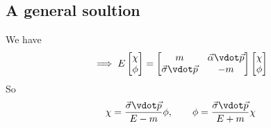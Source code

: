 \subsection{A general soultion}
\label{sec:general-soultion}
We have
\[ \implies E
\begin{bmatrix}
  \chi \\ \phi
\end{bmatrix}
=
\begin{bmatrix}
  m & \vec{\alpha} \vdot \vec{p} \\ \vec{\sigma} \vdot \vec{p} & -m
\end{bmatrix}
\begin{bmatrix}
  \chi \\ \phi
\end{bmatrix}
\]
So
\begin{equation*}
  \chi = \frac{\vec{\sigma} \vdot \vec{p}}{E-m} \phi, \qquad \phi = \frac{\vec{\sigma} \vdot \vec{p}}{E+m} \chi
\end{equation*}


